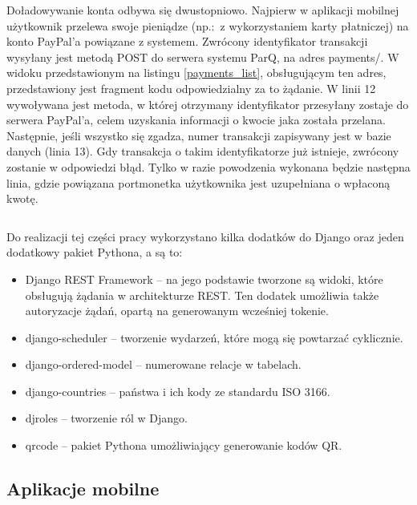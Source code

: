 Doładowywanie konta odbywa się dwustopniowo. Najpierw w aplikacji mobilnej użytkownik przelewa swoje pieniądze (np.:~z wykorzystaniem karty płatniczej) na konto PayPal'a powiązane z systemem. Zwrócony identyfikator transakcji wysyłany jest metodą POST do serwera systemu ParQ, na adres payments/. W widoku przedstawionym na listingu \ref{payments_list}, obsługującym ten adres, przedstawiony jest fragment kodu odpowiedzialny za to żądanie. W linii 12 wywoływana jest metoda, w której otrzymany identyfikator przesyłany zostaje do serwera PayPal'a, celem uzyskania informacji o kwocie jaka została przelana. Następnie, jeśli wszystko się zgadza, numer transakcji zapisywany jest w bazie danych (linia 13). Gdy transakcja o takim identyfikatorze już istnieje, zwrócony zostanie w odpowiedzi błąd. Tylko w razie powodzenia wykonana będzie następna linia, gdzie powiązana portmonetka użytkownika jest uzupełniana o wpłaconą kwotę.

\begin{singlespace}
	\label{payments_list}
	\vspace{0.3cm}
	\inputminted[fontsize=\footnotesize, linenos=true]{python}{src/imp/paypal-views.py}
\end{singlespace}

\vspace{0.3cm}

Do realizacji tej części pracy wykorzystano kilka dodatków do Django oraz jeden dodatkowy pakiet Pythona, a są to:
\begin{itemize}
	\item Django REST Framework -- na jego podstawie tworzone są widoki, które obsługują żądania w architekturze REST. Ten dodatek umożliwia także autoryzacje żądań, opartą na generowanym wcześniej tokenie.
	\item django-scheduler -- tworzenie wydarzeń, które mogą się powtarzać cyklicznie.
	\item django-ordered-model -- numerowane relacje w tabelach.
	\item django-countries -- państwa i ich kody ze standardu ISO 3166.
	\item djroles -- tworzenie ról w Django.
	\item qrcode -- pakiet Pythona umożliwiający generowanie kodów QR.
\end{itemize}

\subsection{Aplikacje mobilne}

